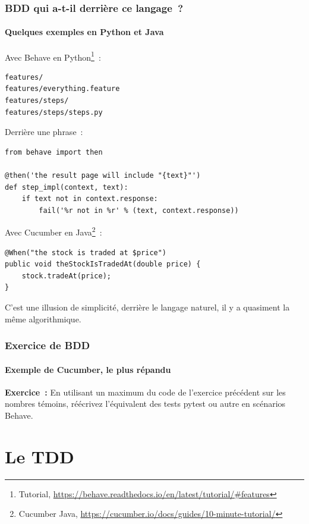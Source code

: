 \documentclass{beamer}
\begin{document}
    \begin{frame}[fragile]
        \frametitle{BDD qui a-t-il derrière ce langage~?}
        \framesubtitle{Quelques exemples en Python et Java}
        \transdissolve
        Avec Behave en Python\footnote{Tutorial, \url{https://behave.readthedocs.io/en/latest/tutorial/\#features}}~:
        \begin{lstlisting}
features/
features/everything.feature
features/steps/
features/steps/steps.py
        \end{lstlisting}
        Derrière une phrase~:
        \begin{lstlisting}
from behave import then

@then('the result page will include "{text}"')
def step_impl(context, text):
    if text not in context.response:
        fail('%r not in %r' % (text, context.response))
        \end{lstlisting}
        Avec Cucumber en Java\footnote{Cucumber Java, \url{https://cucumber.io/docs/guides/10-minute-tutorial/}}~:
        \begin{lstlisting}
@When("the stock is traded at $price")
public void theStockIsTradedAt(double price) {
    stock.tradeAt(price);
}
        \end{lstlisting}
        \bigbreak
        C'est une illusion de simplicité, derrière le langage naturel, il y a quasiment la même algorithmique.
    \end{frame}

    \begin{frame}
        \frametitle{Exercice \execcounterdispinc{} de BDD}
        \framesubtitle{Exemple de Cucumber, le plus répandu}
        \transdissolve
        \textbf{Exercice~:} En utilisant un maximum du code de l'exercice précédent sur les nombres témoins, réécrivez l'équivalent des tests pytest ou autre en scénarios Behave.
    \end{frame}


    \section{Le TDD}\label{sec:le-tdd}
\end{document}
